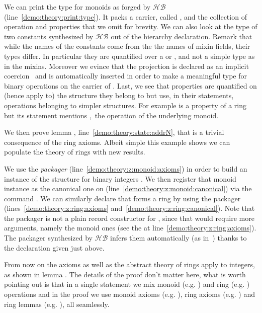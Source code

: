 \documentclass[a4paper,UKenglish,cleveref, autoref]{lipics-v2019}
\newcommand{\HB}{\ensuremath{\mathcal{HB}}}
\newcommand{\mixin}{mixin}
\newcommand{\mixins}{mixins}
\newcommand{\packager}{packager}
\theoremstyle{implem}
\theoremstyle{implem}
\theoremstyle{axiom}
\theoremstyle{abscommand}
\theoremstyle{command}
\begin{document}
We can print the type for monoids as forged by \HB{} (line~\ref{demo:theory:print:type}).
It packs a carrier, called , and the collection of operation and
properties that we omit for brevity.  We can also look at the type of two
constants synthesized by \HB{} out of the hierarchy declaration. Remark that
while the names of the constants come from the the names of \mixin{} fields,
their types differ.
In particular they are quantified over a  or ,
and not a simple type  as in the \mixins{}. Moreover we evince that
the  projection is declared as an implicit coercion~\cite{Saibi97}
and is automatically inserted in order to make  a meaningful
type for binary operations on the carrier of . Last, we see that
properties are quantified on (hence apply to) the structure they belong to but
use, in their statements, operations belonging to simpler structures.
For example  is a property of a ring but  its statement mentions ,\
the operation of the underlying monoid.

We then prove lemma , line~\ref{demo:theory:state:addrN}, that is
a trivial consequence of the ring axioms. Albeit simple this example shows
we can populate the theory of rings with new results.

We use the  \emph{\packager{}}
(line~\ref{demo:theory:z:monoid:axioms})
in order to build an instance of the 
structure for binary integers .
We then register that monoid instance as the canonical one on 
(line~\ref{demo:theory:z:monoid:canonical}) via the command
.
We can similarly declare that  forms a ring by using
the  \packager{}
(lines~\ref{demo:theory:z:ring:axioms} and~\ref{demo:theory:z:ring:canonical}).
Note that the \coq{Ring_of_Monoid.Axioms} \packager{} is not
a plain record constructor for , since that
would require more arguments, namely the monoid ones (see the \coq{_}
at line~\ref{demo:theory:z:ring:axioms}). The
\packager{} synthesized by \HB{} infers them automatically
(as in~\cite[Section 7]{DBLP:conf/itp/MahboubiT13}) thanks to the 
declaration given just above.

From now on the axioms as well as the abstract theory of rings apply to
integers, as shown in lemma \coq{exercise}. The details of the proof
don't matter here, what is worth pointing out is that in a single
statement we mix monoid (e.g. \coq{+}) and ring (e.g. \coq{-}) operations and in the
proof we use monoid axioms (e.g. \coq{addrA}), ring axioms
(e.g. ) and ring lemmas (e.g. ), all seamlessly.
\end{document}
